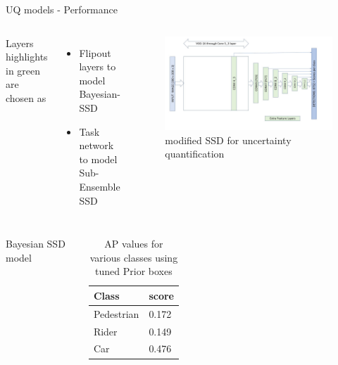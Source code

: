 \documentclass[10pt, aspectratio=169]{beamer}
\begin{document}
\begin{frame}[allowframebreaks]{UQ models - Performance}
    \begin{columns}
            Layers highlights in green are chosen as 
            \begin{itemize}
                \setlength\itemsep{1em}
                \item Flipout layers to model Bayesian-SSD
                \item Task network to model Sub-Ensemble SSD
            \end{itemize} 
            \begin{figure}
                \includegraphics[scale=0.25]{images/SSD300_flipout.jpg}
                \caption{modified SSD for uncertainty quantification}
            \end{figure}
    \end{columns}
    \pagebreak
    \begin{itemize}
        \begin{columns}
            \item Bayesian SSD model
                \begin{table}
                    \caption{AP values for various classes using tuned Prior boxes}
                    \begin{tabular}{ll}
                        \hline
                            \textbf{Class} & \textbf{score} \\ \hline
                            Pedestrian     & 0.172            \\ \hline
                            Rider          & 0.149              \\ \hline
                            Car            & 0.476              \\ \hline

\end{tabular}
\end{table}
\end{columns}
\end{itemize}
\end{frame}
\end{document}
